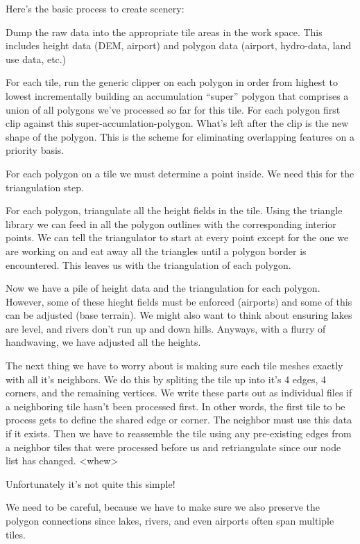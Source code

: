 \documentclass[12pt]{article}
\begin{document}
Here's the basic process to create scenery:

Dump the raw data into the appropriate tile areas in the work space.
This includes height data (DEM, airport) and polygon data (airport,
hydro-data, land use data, etc.)

For each tile, run the generic clipper on each polygon in order from
highest to lowest incrementally building an accumulation ``super''
polygon that comprises a union of all polygons we've processed so far
for this tile.  For each polygon first clip against this
super-accumlation-polygon.  What's left after the clip is the new
shape of the polygon.  This is the scheme for eliminating overlapping
features on a priority basis.

For each polygon on a tile we must determine a point inside.  We need
this for the triangulation step.

For each polygon, triangulate all the height fields in the tile.
Using the triangle library we can feed in all the polygon outlines
with the corresponding interior points.  We can tell the triangulator
to start at every point except for the one we are working on and eat
away all the triangles until a polygon border is encountered.  This
leaves us with the triangulation of each polygon.

Now we have a pile of height data and the triangulation for each
polygon.  However, some of these hieght fields must be enforced
(airports) and some of this can be adjusted (base terrain).  We might
also want to think about ensuring lakes are level, and rivers don't
run up and down hills.  Anyways, with a flurry of handwaving, we have
adjusted all the heights.

The next thing we have to worry about is making sure each tile meshes
exactly with all it's neighbors.  We do this by spliting the tile up
into it's 4 edges, 4 corners, and the remaining vertices.  We write
these parts out as individual files if a neighboring tile hasn't been
processed first.  In other words, the first tile to be process gets to
define the shared edge or corner.  The neighbor must use this data if
it exists.  Then we have to reassemble the tile using any pre-existing
edges from a neighbor tiles that were processed before us and
retriangulate since our node list has changed. <whew>

Unfortunately it's not quite this simple!

We need to be careful, because we have to make sure we also preserve
the polygon connections since lakes, rivers, and even airports often
span multiple tiles.
\end{document}
